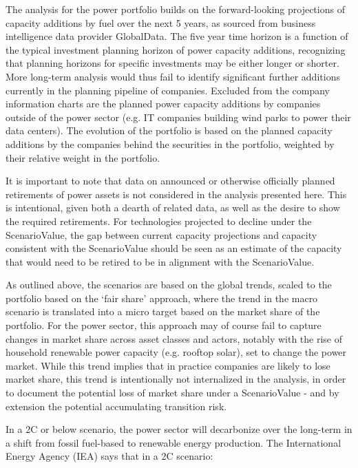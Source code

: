 \documentclass[10pt,table]{article}\usepackage[]{graphicx}\usepackage[]{color}
\begin{document}
	\begin{multicols}{2}

		The analysis for the power portfolio builds on the forward-looking projections of capacity additions by fuel over the next 5 years, as sourced from business intelligence data provider GlobalData. The five year time horizon is a function of the typical investment planning horizon of power capacity additions, recognizing that planning horizons for specific investments may be either longer or shorter. More long-term analysis would thus fail to identify significant further additions currently in the planning pipeline of companies. Excluded from the company information charts are the planned power capacity additions by companies outside of the power sector (e.g. IT companies building wind parks to power their data centers). The evolution of the portfolio is based on the planned capacity additions by the companies behind the securities in the portfolio, weighted by their relative weight in the portfolio. 

		It is important to note that data on announced or otherwise officially planned retirements of power assets is not considered in the analysis presented here. This is intentional, given both a dearth of related data, as well as the desire to show the required retirements. For technologies projected to decline under the ScenarioValue, the gap between current capacity projections and capacity consistent with the ScenarioValue should be seen as an estimate of the capacity that would need to be retired to be in alignment with the ScenarioValue. 

		As outlined above, the scenarios are based on the global trends, scaled to the portfolio based on the `fair share' approach, where the trend in the macro scenario is translated into a micro target based on the market share of the portfolio. For the power sector, this approach may of course fail to capture changes in market share across asset classes and actors, notably with the rise of household renewable power capacity (e.g. rooftop solar), set to change the power market. While this trend implies that in practice companies are likely to lose market share, this trend is intentionally not internalized in the analysis, in order to document the potential loss of market share under a ScenarioValue - and by extension the potential accumulating transition risk.

		In a 2\degree C or below scenario, the power sector will decarbonize over the long-term in a shift from fossil fuel-based to renewable energy production. The International Energy Agency (IEA) says that in a 2\degree C scenario:


\end{multicols}
\end{document}
